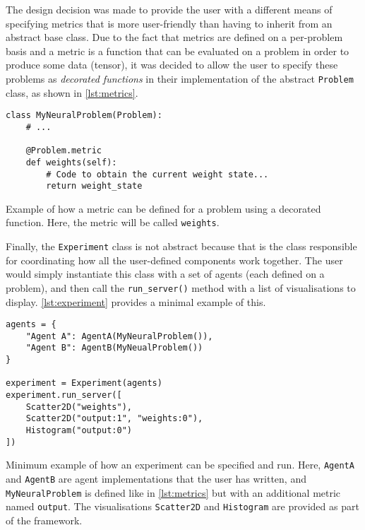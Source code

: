 The design decision was made to provide the user with a different means of specifying metrics that is more user-friendly than having to inherit from an abstract base class.
Due to the fact that metrics are defined on a per-problem basis and a metric is a function that can be evaluated on a problem in order to produce some data (tensor), it was decided to allow the user to specify these problems as \textit{decorated functions} in their implementation of the abstract \texttt{Problem} class, as shown in \ref{lst:metrics}.
\begin{listing}[h]
\begin{verbatim}
class MyNeuralProblem(Problem):
    # ...
    
    @Problem.metric
    def weights(self):
        # Code to obtain the current weight state...
        return weight_state
\end{verbatim}
\caption{Example of how a metric can be defined for a problem using a decorated function. Here, the metric will be called \texttt{weights}.}
\label{lst:metrics}
\end{listing}

Finally, the \texttt{Experiment} class is not abstract because that is the class responsible for coordinating how all the user-defined components work together.
The user would simply instantiate this class with a set of agents (each defined on a problem), and then call the \texttt{run\_server()} method with a list of visualisations to display. \ref{lst:experiment} provides a minimal example of this.
\begin{listing}[h]
\begin{verbatim}
agents = {
    "Agent A": AgentA(MyNeuralProblem()),
    "Agent B": AgentB(MyNeualProblem())
}

experiment = Experiment(agents)
experiment.run_server([
    Scatter2D("weights"),
    Scatter2D("output:1", "weights:0"),
    Histogram("output:0")
])
\end{verbatim}
\caption{Minimum example of how an experiment can be specified and run. Here, \texttt{AgentA} and \texttt{AgentB} are agent implementations that the user has written, and \texttt{MyNeuralProblem} is defined like in \ref{lst:metrics} but with an additional metric named \texttt{output}. The visualisations \texttt{Scatter2D} and \texttt{Histogram} are provided as part of the framework.}
\label{lst:experiment}
\end{listing}

